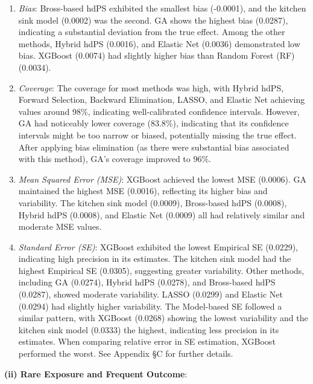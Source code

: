 \documentclass[sn-vancouver,Numbered,lineno,pdflatex]{sn-jnl}
\begin{document}
\begin{enumerate}
\def\labelenumi{\arabic{enumi}.}
\item
  \emph{Bias}: Bross-based hdPS exhibited the smallest bias (-0.0001),
  and the kitchen sink model (0.0002) was the second. GA shows the
  highest bias (0.0287), indicating a substantial deviation from the
  true effect. Among the other methods, Hybrid hdPS (0.0016), and
  Elastic Net (0.0036) demonstrated low bias. XGBoost (0.0074) had
  slightly higher bias than Random Forest (RF) (0.0034).
\item
  \emph{Coverage}: The coverage for most methods was high, with Hybrid
  hdPS, Forward Selection, Backward Elimination, LASSO, and Elastic Net
  achieving values around 98\%, indicating well-calibrated confidence
  intervals. However, GA had noticeably lower coverage (83.8\%),
  indicating that its confidence intervals might be too narrow or
  biased, potentially missing the true effect. After applying bias
  elimination (as there were substantial bias associated with this
  method), GA's coverage improved to 96\%.
\item
  \emph{Mean Squared Error (MSE)}: XGBoost achieved the lowest MSE
  (0.0006). GA maintained the highest MSE (0.0016), reflecting its
  higher bias and variability. The kitchen sink model (0.0009),
  Bross-based hdPS (0.0008), Hybrid hdPS (0.0008), and Elastic Net
  (0.0009) all had relatively similar and moderate MSE values.
\item
  \emph{Standard Error (SE)}: XGBoost exhibited the lowest Empirical SE
  (0.0229), indicating high precision in its estimates. The kitchen sink
  model had the highest Empirical SE (0.0305), suggesting greater
  variability. Other methods, including GA (0.0274), Hybrid hdPS
  (0.0278), and Bross-based hdPS (0.0287), showed moderate variability.
  LASSO (0.0299) and Elastic Net (0.0294) had slightly higher
  variability. The Model-based SE followed a similar pattern, with
  XGBoost (0.0268) showing the lowest variability and the kitchen sink
  model (0.0333) the highest, indicating less precision in its
  estimates. When comparing relative error in SE estimation, XGBoost
  performed the worst. See Appendix \S C for further details.
\end{enumerate}

\textbf{(ii) Rare Exposure and Frequent Outcome}:
\end{document}
